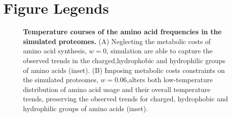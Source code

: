 \documentclass[10pt,letterpaper]{article}
\begin{document}



\section*{Figure Legends}
%







\begin{figure}[h!]
\caption{
{\bf Temperature courses of the amino acid frequencies in the simulated proteomes.} (A) Neglecting the metabolic costs of amino acid synthesis, $\mathit{w}=0$, simulation are able to capture the observed trends in the charged,hydrophobic and hydrophilic groups of amino acids (inset). (B) Imposing metabolic costs constraints on the simulated proteomes, $\mathit{w}=0.06$,alters both low-temperature distribution of amino acid usage and their overall temperature trends, preserving the observed trends for charged, hydrophobic and hydrophilic groups of amino acids (inset).
}
\label{fig:fig3}
\end{figure}
\end{document}
